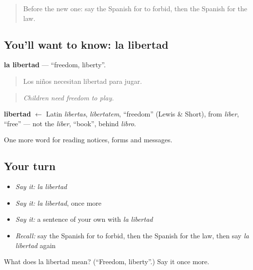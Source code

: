\begin{quote}
Before the new one: say the Spanish for to forbid, then the Spanish for the law.
\end{quote}

\subsection*{You'll want to know: la libertad}
\textbf{la libertad} — \textquotedblleft{}freedom, liberty\textquotedblright{}.

\begin{quote}
Los niños necesitan libertad para jugar.
\end{quote}

\begin{quote}
\emph{Children need freedom to play.}
\end{quote}

\begin{cousinweb}
\textbf{libertad} $\leftarrow$ Latin \emph{libertas}, \emph{libertatem}, \textquotedblleft{}freedom\textquotedblright{} (Lewis \& Short), from \emph{liber}, \textquotedblleft{}free\textquotedblright{} — not the \emph{liber}, \textquotedblleft{}book\textquotedblright{}, behind \emph{libro}.
\end{cousinweb}

\begin{grammarlens}[title={What you've built}]
One more word for reading notices, forms and messages.
\end{grammarlens}

\subsection*{Your turn}
\begin{itemize}
\raggedright
  \item \emph{Say it:} \emph{la libertad}
  \item \emph{Say it:} \emph{la libertad}, once more
  \item \emph{Say it:} a sentence of your own with \emph{la libertad}
  \item \emph{Recall:} say the Spanish for to forbid, then the Spanish for the law, then say \emph{la libertad} again
\end{itemize}

\begin{tcolorbox}[breakable,colback=teal!4,colframe=teal!35!black,title={Before you move on}]
What does la libertad mean? (\textquotedblleft{}Freedom, liberty\textquotedblright{}.) Say it once more.
\end{tcolorbox}
